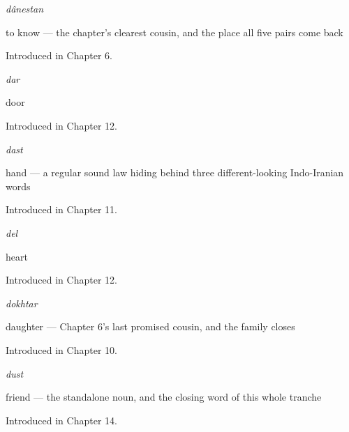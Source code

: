 \noindent\begin{minipage}[t]{\linewidth}
\raggedright
\textbf{}\enspace\emph{dânestan}\par
\small to know — the chapter's clearest cousin, and the place all five pairs come back\par
\footnotesize Introduced in Chapter 6.
\end{minipage}\par\medskip

\noindent\begin{minipage}[t]{\linewidth}
\raggedright
\textbf{}\enspace\emph{dar}\par
\small door\par
\footnotesize Introduced in Chapter 12.
\end{minipage}\par\medskip

\noindent\begin{minipage}[t]{\linewidth}
\raggedright
\textbf{}\enspace\emph{dast}\par
\small hand — a regular sound law hiding behind three different-looking Indo-Iranian words\par
\footnotesize Introduced in Chapter 11.
\end{minipage}\par\medskip

\noindent\begin{minipage}[t]{\linewidth}
\raggedright
\textbf{}\enspace\emph{del}\par
\small heart\par
\footnotesize Introduced in Chapter 12.
\end{minipage}\par\medskip

\noindent\begin{minipage}[t]{\linewidth}
\raggedright
\textbf{}\enspace\emph{dokhtar}\par
\small daughter — Chapter 6's last promised cousin, and the family closes\par
\footnotesize Introduced in Chapter 10.
\end{minipage}\par\medskip

\noindent\begin{minipage}[t]{\linewidth}
\raggedright
\textbf{}\enspace\emph{dust}\par
\small friend — the standalone noun, and the closing word of this whole tranche\par
\footnotesize Introduced in Chapter 14.
\end{minipage}\par\medskip

